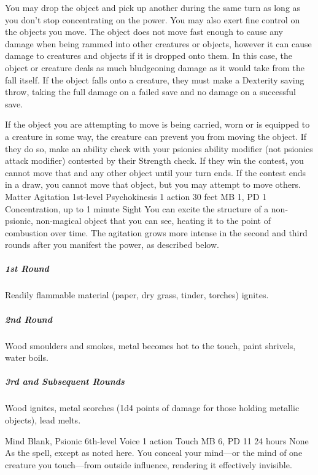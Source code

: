 You may drop the object and pick up another during the same
turn as long as you don't stop concentrating on the power.
You may also exert fine control on the objects you move. The
object does not move fast enough to cause any damage when
being rammed into other creatures or objects, however it can
cause damage to creatures and objects if it is dropped onto
them. In this case,
the object or creature deals as much bludgeoning
damage as it would take from the fall itself. If the object
falls onto a creature, they must make a Dexterity saving throw,
taking the full damage on a failed save and no damage on a
successful save.

If the object you are attempting to move is being carried,
worn or is equipped to a creature in some way, the creature
can prevent you from moving the object. If they do so, make
an ability check with your psionics ability modifier (not
psionics attack modifier) contested by their Strength check.
If they win the contest, you cannot move that and any other
object until your turn ends. If the contest ends in a draw,
you cannot move that object, but you may attempt to move others.
\DndPowerHeader%
    {Matter Agitation\label{pwr:matter_agitation}}
    {1st-level Psychokinesis}
    {1 action}
    {30 feet}
    {MB 1, PD 1}
    {Concentration, up to 1 minute}
    {Sight}
You can excite the structure of a non-psionic,
non-magical object that you can see,
heating it to the point of combustion over time.
The agitation grows more intense in the second and third rounds
after you manifest the power, as described below.

\subparagraph{1st Round}
  Readily flammable material
  (paper, dry grass, tinder, torches) ignites.
\subparagraph{2nd Round}
  Wood smoulders and smokes,
  metal becomes hot to the touch,
  paint shrivels, water boils.
\subparagraph{3rd and Subsequent Rounds}
  Wood ignites, metal scorches
  (1d4 points of damage for those holding metallic objects),
  lead melts.

\DndPowerHeader%
    {Mind Blank, Psionic\label{pwr:mind_blank_psionic}}
    {6th-level Voice}
    {1 action}
    {Touch}
    {MB 6, PD 11}
    {24 hours}
    {None}
As the  spell, except as
noted here. You conceal your mind---or the mind of one creature
you touch---from outside influence, rendering it effectively
invisible.

